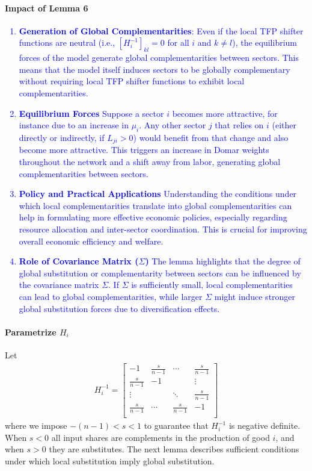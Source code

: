 \documentclass[11pt]{article}
\theoremstyle{definition}
\begin{document}
	\paragraph{Impact of Lemma 6}
	\textcolor{blue}{\begin{enumerate}[leftmargin=1cm, label=\arabic*.]
			\item \textbf{Generation of Global Complementarities}: Even if the local TFP shifter functions are neutral (i.e., \(\left[ H_i^{-1} \right]_{kl} = 0\) for all \(i\) and \(k \neq l\)), the equilibrium forces of the model generate global complementarities between sectors. This means that the model itself induces sectors to be globally complementary without requiring local TFP shifter functions to exhibit local complementarities.
			\item \textbf{Equilibrium Forces} Suppose a sector \(i\) becomes more attractive, for instance due to an increase in \(\mu_i\). Any other sector \(j\) that relies on \(i\) (either directly or indirectly, if \(L_{ji} > 0\)) would benefit from that change and also become more attractive. This triggers an increase in Domar weights throughout the network and a shift away from labor, generating global complementarities between sectors.
			\item \textbf{Policy and Practical Applications} Understanding the conditions under which local complementarities translate into global complementarities can help in formulating more effective economic policies, especially regarding resource allocation and inter-sector coordination. This is crucial for improving overall economic efficiency and welfare.
			\item \textbf{Role of Covariance Matrix (\(\Sigma\))} The lemma highlights that the degree of global substitution or complementarity between sectors can be influenced by the covariance matrix \(\Sigma\). If \(\Sigma\) is sufficiently small, local complementarities can lead to global complementarities, while larger \(\Sigma\) might induce stronger global substitution forces due to diversification effects.
	\end{enumerate}}

	\paragraph{Parametrize $H_i$}
	Let
	\begin{align}
		H_i^{-1} = \left[\begin{array}{cccc}
			-1 & \frac{s}{n-1} & \cdots & \frac{s}{n-1} \\
			\frac{s}{n-1} & -1 &  & \vdots \\
			\vdots & & \ddots & \frac{s}{n-1} \\
			\frac{s}{n-1} & \cdots & \frac{s}{n-1} & -1 \\
		\end{array} \right] \label{eq-33}
	\end{align}
	where we impose $-(n-1) < s < 1$ to guarantee that $H_i^{-1}$ is negative definite. When $s < 0$ all input shares are complements in the production of good $i$, and when $s > 0$ they are substitutes. The next lemma describes sufficient conditions under which local substitution imply global substitution.
	
\end{document}
